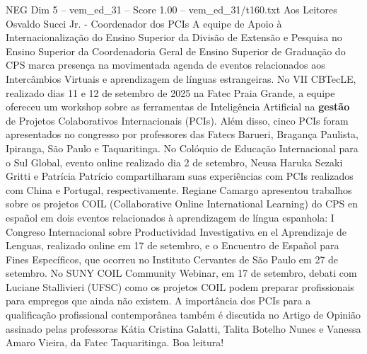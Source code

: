 \begin{textsample}{NEG Dim 5 – vem\_ed\_31 – Score 1.00 – vem\_ed\_31/t160.txt}  \label{ex:f5_neg_122}
Aos Leitores Osvaldo Succi Jr. - Coordenador dos PCIs A equipe de Apoio à Internacionalização do Ensino Superior da Divisão de Extensão e Pesquisa no Ensino Superior da Coordenadoria Geral de Ensino Superior de Graduação do CPS marca presença na movimentada agenda de eventos relacionados aos Intercâmbios Virtuais e aprendizagem de línguas estrangeiras.
No VII CBTecLE, realizado dias 11 e 12 de setembro de 2025 na Fatec Praia Grande, a equipe ofereceu um workshop sobre as ferramentas de Inteligência Artificial na \textbf{gestão} de Projetos Colaborativos Internacionais (PCIs).
Além disso, cinco PCIs foram apresentados no congresso por professores das Fatecs Barueri, Bragança Paulista, Ipiranga, São Paulo e Taquaritinga.
No Colóquio de Educação Internacional para o Sul Global, evento online realizado dia 2 de setembro, Neusa Haruka Sezaki Gritti e Patrícia Patrício compartilharam suas experiências com PCIs realizados com China e Portugal, respectivamente.
Regiane Camargo apresentou trabalhos sobre os projetos COIL (Collaborative Online International Learning) do CPS en español em dois eventos relacionados à aprendizagem de língua espanhola: I Congreso Internacional sobre Productividad Investigativa en el Aprendizaje de Lenguas, realizado online em 17 de setembro, e o Encuentro de Español para Fines Específicos, que ocorreu no Instituto Cervantes de São Paulo em 27 de setembro.
No SUNY COIL Community Webinar, em 17 de setembro, debati com Luciane Stallivieri (UFSC) como os projetos COIL podem preparar profissionais para empregos que ainda não existem.
A importância dos PCIs para a qualificação profissional contemporânea também é discutida no Artigo de Opinião assinado pelas professoras Kátia Cristina Galatti, Talita Botelho Nunes e Vanessa Amaro Vieira, da Fatec Taquaritinga.
Boa leitura!

\end{textsample}
